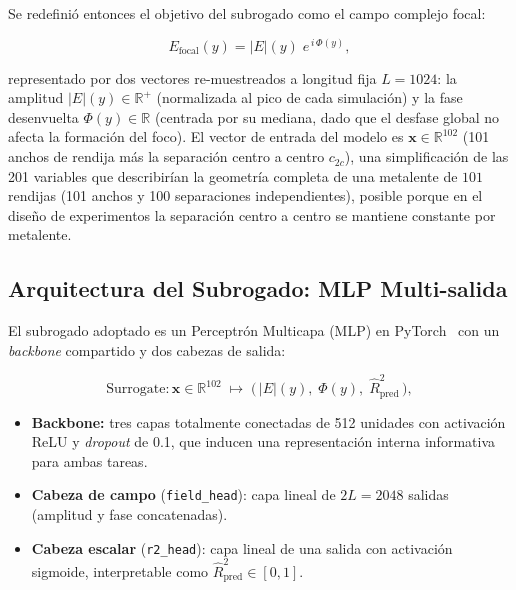 Se redefinió entonces el objetivo del subrogado como el campo complejo focal:

\begin{equation}
    E_{\text{focal}}(y) = |E|(y)\; e^{\, i\,\Phi(y)},
    \label{eq:campo_focal}
\end{equation}

\noindent representado por dos vectores re-muestreados a longitud fija $L = 1024$: la amplitud $|E|(y) \in \mathbb{R}^{+}$ (normalizada al pico de cada simulación) y la fase desenvuelta $\Phi(y) \in \mathbb{R}$ (centrada por su mediana, dado que el desfase global no afecta la formación del foco). El vector de entrada del modelo es $\mathbf{x} \in \mathbb{R}^{102}$ (101 anchos de rendija más la separación centro a centro $c_{2c}$), una simplificación de las 201 variables que describirían la geometría completa de una metalente de $101$ rendijas (101 anchos y 100 separaciones independientes), posible porque en el diseño de experimentos la separación centro a centro se mantiene constante por metalente.

\subsection{Arquitectura del Subrogado: MLP Multi-salida}\label{subsec:arquitectura_mvp}

El subrogado adoptado es un Perceptrón Multicapa (MLP) en PyTorch~\cite{paszke2019pytorch} con un \textit{backbone} compartido y dos cabezas de salida:

\begin{equation}
    \text{Surrogate}: \mathbf{x} \in \mathbb{R}^{102} \;\longmapsto\;
    \big(\,|E|(y),\; \Phi(y),\; \hat{R}^2_{\text{pred}}\,\big),
    \label{eq:surrogate_mvp}
\end{equation}

\begin{itemize}
    \item \textbf{Backbone:} tres capas totalmente conectadas de 512 unidades con activación ReLU y \textit{dropout} de 0.1, que inducen una representación interna informativa para ambas tareas.
    \item \textbf{Cabeza de campo} (\texttt{field\_head}): capa lineal de $2L = 2048$ salidas (amplitud y fase concatenadas).
    \item \textbf{Cabeza escalar} (\texttt{r2\_head}): capa lineal de una salida con activación sigmoide, interpretable como $\hat{R}^2_{\text{pred}} \in [0,1]$.
\end{itemize}

